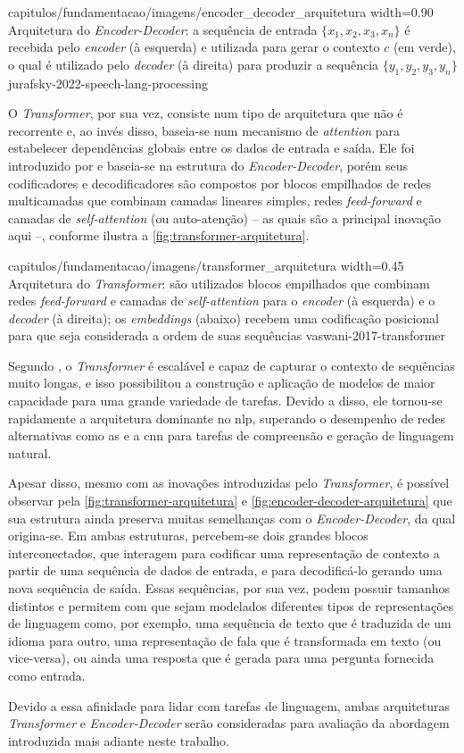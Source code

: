 {capitulos/fundamentacao/imagens/encoder_decoder_arquitetura}
{width=0.90\textwidth}
{Arquitetura do \textit{Encoder-Decoder}: a sequência de entrada \(\{x_1, x_2, x_3, x_n\}\) é recebida pelo \textit{encoder} (à esquerda) e utilizada para gerar o contexto \(c\) (em verde), o qual é utilizado pelo \textit{decoder} (à direita) para produzir a sequência \(\{y_1, y_2, y_3, y_n\}\)}
{jurafsky-2022-speech-lang-processing}



O \textit{Transformer}, por sua vez, consiste num tipo de arquitetura que não é recorrente e, ao invés disso, baseia-se num mecanismo de \textit{attention} para estabelecer dependências globais entre os dados de entrada e saída.
Ele foi introduzido por  e baseia-se na estrutura do \textit{Encoder-Decoder}, porém seus codificadores e decodificadores são compostos por blocos empilhados de redes multicamadas que combinam camadas lineares simples, redes \textit{feed-forward} e camadas de \textit{self-attention} (ou auto-atenção) -- as quais são a principal inovação aqui --, conforme ilustra a \autoref{fig:transformer-arquitetura}.


{capitulos/fundamentacao/imagens/transformer_arquitetura}
{width=0.45\textwidth}
{Arquitetura do \textit{Transformer}: são utilizados blocos empilhados que combinam redes \textit{feed-forward} e camadas de \textit{self-attention} para o \textit{encoder} (à esquerda) e o \textit{decoder} (à direita); os \textit{embeddings} (abaixo) recebem uma codificação posicional para que seja considerada a ordem de suas sequências}
{vaswani-2017-transformer}


Segundo , o \textit{Transformer} é escalável e capaz de capturar o contexto de sequências muito longas, e isso possibilitou a construção e aplicação de modelos de maior capacidade para uma grande variedade de tarefas. 
Devido a disso, ele tornou-se rapidamente a arquitetura dominante no \acrshort{nlp}, superando o desempenho de redes alternativas como as  e a \acrfull{cnn} para tarefas  de compreensão e geração de linguagem natural.


Apesar disso, mesmo com as inovações introduzidas pelo \textit{Transformer}, é possível observar pela \autoref{fig:transformer-arquitetura} e \autoref{fig:encoder-decoder-arquitetura} que sua estrutura ainda preserva muitas semelhanças com o \textit{Encoder-Decoder}, da qual origina-se.
Em ambas estruturas, percebem-se dois grandes blocos interconectados, que interagem para codificar uma representação de contexto a partir de uma sequência de dados de entrada, e para decodificá-lo gerando uma nova sequência de saída. 
Essas sequências, por sua vez, podem possuir tamanhos distintos e permitem com que sejam modelados diferentes tipos de representações de linguagem como, por exemplo, uma sequência de texto que é traduzida de um idioma para outro, uma representação de fala que é transformada em texto (ou vice-versa), ou ainda uma resposta que é gerada para uma pergunta fornecida como entrada.

Devido a essa afinidade para lidar com tarefas de linguagem, ambas arquiteturas \textit{Transformer} e \textit{Encoder-Decoder} serão consideradas para avaliação da abordagem introduzida mais adiante neste trabalho.
